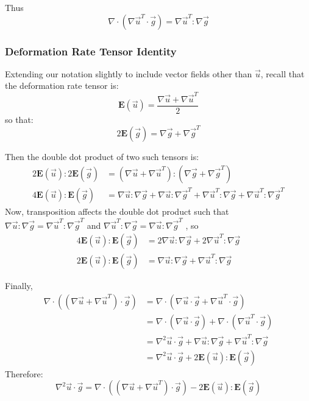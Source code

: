 \documentclass[12pt, a4paper, twoside, openright]{book}
\begin{document}
Thus
\begin{equation*}
\nabla \cdot (\nabla \vec{u}^T \cdot \vec{g}) = \nabla \vec{u}^T:\nabla \vec{g}
\end{equation*}

\subsubsection*{Deformation Rate Tensor Identity}

Extending our notation slightly to include vector fields other than $\vec{u}$, recall that the deformation rate tensor is:
\begin{equation*}
\mathbf{E}(\vec{u}) = \frac{\nabla \vec{u} + \nabla \vec{u}^T }{2}
\end{equation*}
so that:
\begin{equation*}
2 \mathbf{E}(\vec{g}) = \nabla \vec{g} + \nabla \vec{g}^T
\end{equation*}

Then the double dot product of two such tensors is:
\begin{align*}
2 \mathbf{E}(\vec{u}):2 \mathbf{E}(\vec{g}) & =
(\nabla \vec{u} + \nabla \vec{u}^T ):(\nabla \vec{g} + \nabla \vec{g}^T ) \\
4 \mathbf{E}(\vec{u}): \mathbf{E}(\vec{g}) & =
   \nabla \vec{u}:\nabla \vec{g} + \nabla \vec{u}:\nabla \vec{g}^T
 + \nabla \vec{u}^T:\nabla \vec{g} + \nabla \vec{u}^T: \nabla \vec{g}^T
\end{align*}
Now, transposition affects the double dot product such that \\
 $\nabla \vec{u}:\nabla \vec{g} =\nabla \vec{u}^T: \nabla \vec{g}^T$ 
 and $ \nabla \vec{u}^T:\nabla \vec{g} = \nabla \vec{u}:\nabla \vec{g}^T $ , so
\begin{align*}
4 \mathbf{E}(\vec{u}): \mathbf{E}(\vec{g}) & =
   2 \nabla \vec{u}:\nabla \vec{g} + 2 \nabla \vec{u}^T:\nabla \vec{g} \\
2 \mathbf{E}(\vec{u}): \mathbf{E}(\vec{g}) & =
   \nabla \vec{u}:\nabla \vec{g} + \nabla \vec{u}^T:\nabla \vec{g}   
\end{align*}

\vspace{1em}
Finally,
\begin{align*}
\nabla \cdot ( (\nabla \vec{u} + \nabla \vec{u}^T) \cdot \vec{g}) & =
\nabla \cdot ( \nabla \vec{u} \cdot \vec{g} + \nabla \vec{u}^T \cdot \vec{g}) \\
  & = \nabla \cdot ( \nabla \vec{u} \cdot \vec{g}) +
      \nabla \cdot ( \nabla \vec{u}^T \cdot \vec{g}) \\
  & = \nabla^2 \vec{u} \cdot \vec{g} + \nabla \vec{u}:\nabla \vec{g}
      + \nabla \vec{u}^T:\nabla \vec{g} \\
  & = \nabla^2 \vec{u} \cdot \vec{g} + 2 \mathbf{E}(\vec{u}):\mathbf{E}(\vec{g})
\end{align*}
Therefore:
\begin{equation*}
\nabla^2 \vec{u} \cdot \vec{g} = 
\nabla \cdot ( (\nabla \vec{u} + \nabla \vec{u}^T) \cdot \vec{g})
- 2 \mathbf{E}(\vec{u}):\mathbf{E}(\vec{g})
\end{equation*}
\end{document}
